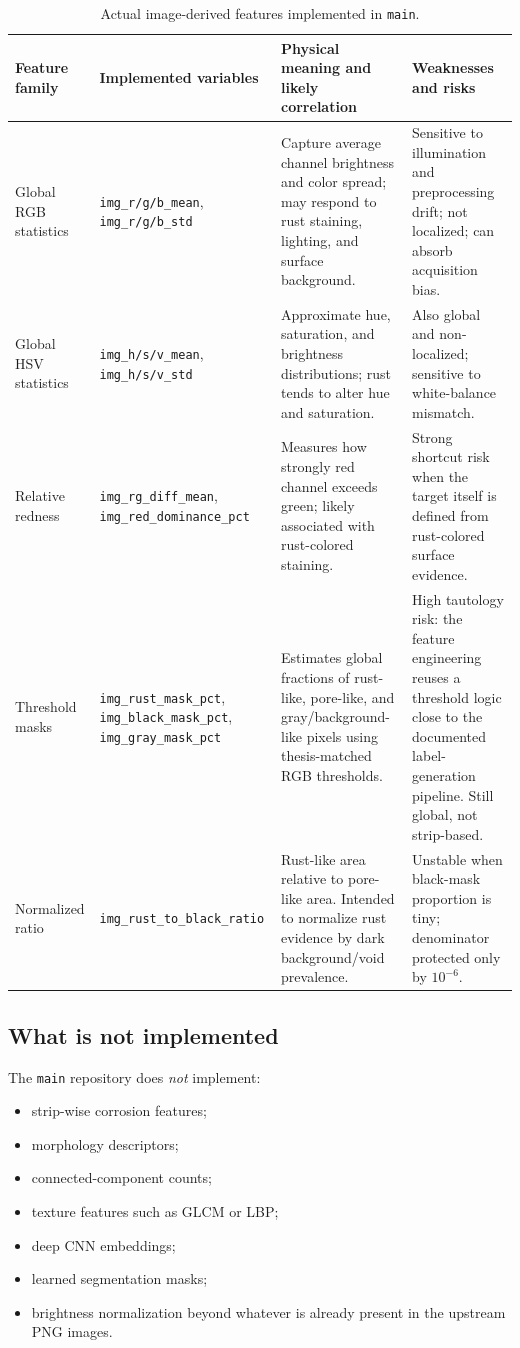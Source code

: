 \documentclass[11pt]{article}
\begin{document}
\begin{table}[H]
\centering
\small
\begin{tabularx}{\textwidth}{p{} p{} Y Y}
\toprule
\textbf{Feature family} & \textbf{Implemented variables} & \textbf{Physical meaning and likely correlation} & \textbf{Weaknesses and risks} \\
\midrule
Global RGB statistics & \texttt{img\_r/g/b\_mean}, \texttt{img\_r/g/b\_std} & Capture average channel brightness and color spread; may respond to rust staining, lighting, and surface background. & Sensitive to illumination and preprocessing drift; not localized; can absorb acquisition bias. \\
Global HSV statistics & \texttt{img\_h/s/v\_mean}, \texttt{img\_h/s/v\_std} & Approximate hue, saturation, and brightness distributions; rust tends to alter hue and saturation. & Also global and non-localized; sensitive to white-balance mismatch. \\
Relative redness & \texttt{img\_rg\_diff\_mean}, \texttt{img\_red\_dominance\_pct} & Measures how strongly red channel exceeds green; likely associated with rust-colored staining. & Strong shortcut risk when the target itself is defined from rust-colored surface evidence. \\
Threshold masks & \texttt{img\_rust\_mask\_pct}, \texttt{img\_black\_mask\_pct}, \texttt{img\_gray\_mask\_pct} & Estimates global fractions of rust-like, pore-like, and gray/background-like pixels using thesis-matched RGB thresholds. & High tautology risk: the feature engineering reuses a threshold logic close to the documented label-generation pipeline. Still global, not strip-based. \\
Normalized ratio & \texttt{img\_rust\_to\_black\_ratio} & Rust-like area relative to pore-like area. Intended to normalize rust evidence by dark background/void prevalence. & Unstable when black-mask proportion is tiny; denominator protected only by \(10^{-6}\). \\
\bottomrule
\end{tabularx}
\caption{Actual image-derived features implemented in \texttt{main}.}
\label{tab:image_feature_families}
\end{table}

\subsection{What is not implemented}
The \texttt{main} repository does \emph{not} implement:
\begin{itemize}
  \item strip-wise corrosion features;
  \item morphology descriptors;
  \item connected-component counts;
  \item texture features such as GLCM or LBP;
  \item deep CNN embeddings;
  \item learned segmentation masks;
  \item brightness normalization beyond whatever is already present in the upstream PNG images.
\end{itemize}
\end{document}
